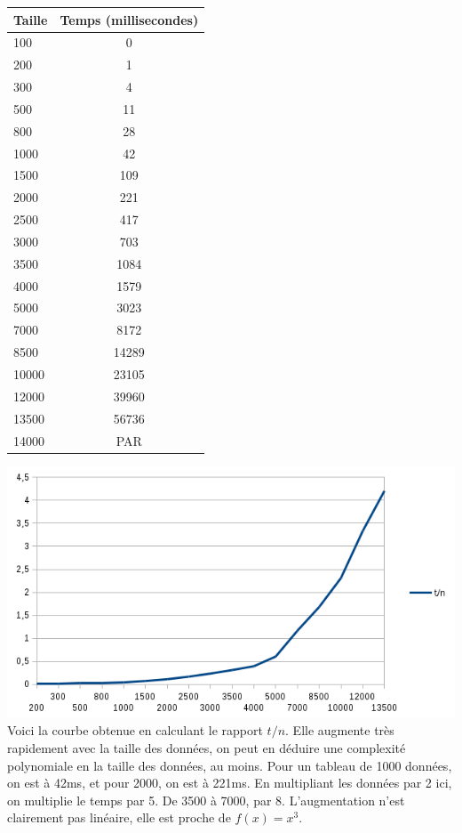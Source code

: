 \documentclass[a4paper, 12pt]{article}
\begin{document}
\begin{minipage}[c]{0.4\linewidth}
   \begin{tabular}{|l|c|}
      \hline
      Taille & Temps (millisecondes) \\
      \hline
   100	& 0 \\
   200	& 1\\
   300	& 4\\
   500	& 11\\
   800	& 28\\
   1000	& 42\\
   1500	& 109\\
   2000	& 221\\
   2500	& 417\\
   3000	& 703\\
   3500	& 1084\\
   4000	& 1579\\
   5000	& 3023\\
   7000	& 8172\\
   8500	& 14289\\
   10000 & 	23105\\
   12000& 	39960\\
   13500& 	56736\\
   14000& 	PAR\\
   \hline
   \end{tabular}
\end{minipage}\hfill
\begin{minipage}[c]{0.6\linewidth}
	\includegraphics[scale=0.6]{curve_algo_1.png}
 	Voici la courbe obtenue en calculant le rapport $t/n$. Elle augmente très rapidement avec la taille des données, on peut en déduire une complexité polynomiale en la taille des données, au moins. Pour un tableau de 1000 données, on est à 42ms, et pour 2000, on est à 221ms. En multipliant les données par 2 ici, on multiplie le temps par 5. De 3500 à 7000, par 8. L'augmentation n'est clairement pas linéaire, elle est proche de $f(x) = x^3$.
\end{minipage}
\end{document}
